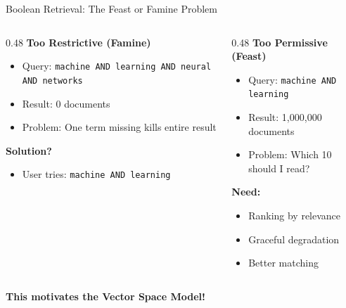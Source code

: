 \documentclass[aspectratio=169]{beamer}
\newif\ifanimated
\newcommand{\cpause}{\ifanimated\pause\fi}
\begin{document}
\begin{frame}{Boolean Retrieval: The Feast or Famine Problem}
\begin{columns}
\begin{column}{0.48\textwidth}
\textbf{Too Restrictive (Famine)}
\begin{itemize}
    \item Query: \texttt{machine AND learning AND neural AND networks}
    \item Result: 0 documents
    \item Problem: One term missing kills entire result
\end{itemize}
\cpause
\vspace{1em}

\textbf{Solution?}
\begin{itemize}
    \item User tries: \texttt{machine AND learning}
\end{itemize}
\cpause
\end{column}

\begin{column}{0.48\textwidth}
\textbf{Too Permissive (Feast)}
\begin{itemize}
    \item Query: \texttt{machine AND learning}
    \item Result: 1,000,000 documents
    \item Problem: Which 10 should I read?
\end{itemize}
\cpause
\vspace{1em}

\textbf{Need:}
\begin{itemize}
    \item Ranking by relevance
    \item Graceful degradation
    \item Better matching
\end{itemize}
\cpause
\end{column}
\end{columns}

\vspace{1em}

\begin{center}
\textbf{This motivates the Vector Space Model!}
\end{center}
\end{frame}

\end{document}
